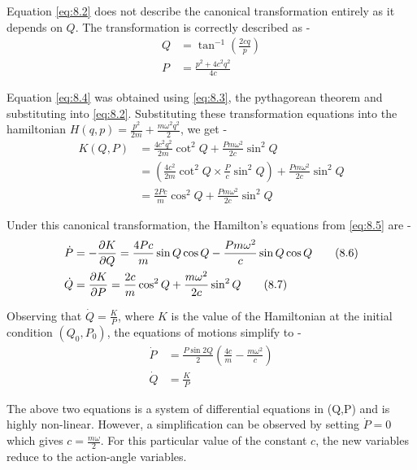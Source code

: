 \documentclass{article}
\begin{document}
\justify
Equation \eqref{eq:8.2} does not describe the canonical transformation entirely as it depends on $Q$. The transformation is correctly described as -
\begin{align*} 
Q &= \tan^{-1}{\left(\frac{2cq}{p}\right)}  \tag{8.3}\label{eq:8.3}\\
P &= \frac{p^2 + 4c^2q^2}{4c} \tag{8.4}\label{eq:8.4}
\end{align*}

\justify
Equation \eqref{eq:8.4} was obtained using \eqref{eq:8.3}, the pythagorean theorem and substituting into \eqref{eq:8.2}. Substituting these transformation equations into the hamiltonian $\displaystyle{H(q,p) = \frac{p^2}{2m} + \frac{m\omega^2 q^2}{2}}$, we get -
\begin{align*} 
K(Q,P) &= \frac{4c^2q^2}{2m}\cot^2{Q} + \frac{Pm\omega^2}{2c}\sin^2{Q}\\
&= \left(\frac{4c^2}{2m}\cot^2{Q} \times \frac{P}{c}\sin^2{Q}\right) + \frac{Pm\omega^2}{2c}\sin^2{Q} \\
&= \frac{2Pc}{m}\cos^2{Q} + \frac{Pm\omega^2}{2c}\sin^2{Q} \tag{8.5}\label{eq:8.5}
\end{align*}

\justify
Under this canonical transformation, the Hamilton's equations from \eqref{eq:8.5} are -
\begin{align*} 
\dot{P} &= -\pdv{K}{Q} = \frac{4Pc}{m}\sin{Q}\cos{Q} - \frac{Pm\omega^2}{c}\sin{Q}\cos{Q} \tag{8.6}\label{eq:8.6} \\
\dot{Q} &= \pdv{K}{P} = \frac{2c}{m}\cos^2{Q} + \frac{m\omega^2}{2c}\sin^2{Q} \tag{8.7}\label{eq:8.7}
\end{align*}

\justify
Observing that $\displaystyle{\dot{Q} = \frac{K}{P}}$, where $K$ is the value of the Hamiltonian at the initial condition $(Q_0, P_0)$, the equations of motions simplify to -
\begin{align*} 
\dot{P} &= \frac{P\sin{2Q}}{2}\left(\frac{4c}{m} - \frac{m\omega^2}{c}\right) \tag{8.7}\label{eq:8.7} \\
\dot{Q} &= \frac{K}{P} \tag{8.8}\label{eq:8.8}
\end{align*}

\justify
The above two equations is a system of differential equations in (Q,P) and is highly non-linear. However, a simplification can be observed by setting $\dot{P} = 0$ which gives $\displaystyle{c=\frac{m\omega}{2}}$. For this particular value of the constant $c$, the new variables reduce to the action-angle variables.
\end{document}
